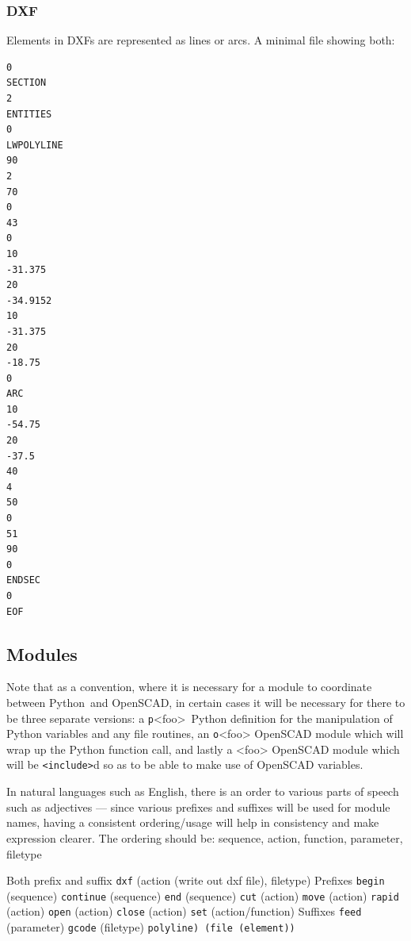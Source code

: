 \documentclass{ltxdoc}
\begin{document}
\subsubsection{DXF}

Elements in DXFs are represented as lines or arcs. A minimal file showing both:

\begin{verbatim}
0
SECTION
2
ENTITIES
0
LWPOLYLINE
90
2
70
0
43
0
10
-31.375
20
-34.9152
10
-31.375
20
-18.75
0
ARC
10
-54.75
20
-37.5
40
4
50
0
51
90
0
ENDSEC
0
EOF
\end{verbatim}

\subsection{Modules}

Note that as a convention, where it is necessary for a module to coordinate between 
Python~and OpenSCAD, in certain cases it will be necessary for there to be three separate 
versions: a \texttt{p}<foo>~Python definition for the manipulation of Python variables and
any file routines, an \texttt{o}<foo> OpenSCAD module which will wrap up the Python
function call, and lastly a <foo> OpenSCAD module which will be \texttt{<include>}d 
so as to be able to make use of OpenSCAD variables.

In natural languages such as English, there is an order to various parts of speech such as 
adjectives 
--- since various prefixes and suffixes will be used for module names, having a consistent 
ordering/usage will help in consistency and make expression clearer.
The ordering should be: sequence, action, function, parameter, filetype

\begin{outline}
\1 Both prefix and suffix
\2 \texttt{dxf} (action (write out dxf file), filetype)
\1 Prefixes
\2 \texttt{begin} (sequence)
\2 \texttt{continue} (sequence)
\2 \texttt{end} (sequence)
\2 \texttt{cut} (action)
\2 \texttt{move} (action)
\2 \texttt{rapid} (action)
\2 \texttt{open} (action)
\2 \texttt{close} (action)
\2 \texttt{set} (action/function)
\1 Suffixes
\2 \texttt{feed} (parameter)
\2 \texttt{gcode} (filetype)
\2 \texttt{polyline) (file (element))}
\end{outline}

\end{document}
